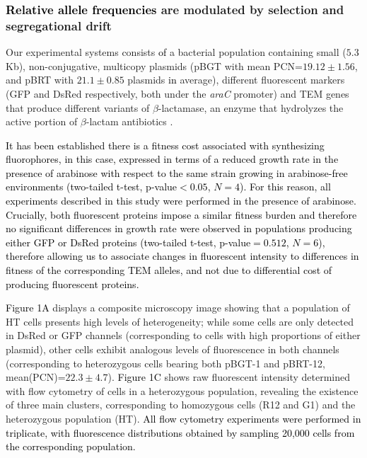 \documentclass[fleqn,12pt]{wlscirep}
\newcommand{\blue}[1]{\textcolor{black}{#1}}
\newcommand{\fig}[1]{\textcolor{black}{#1}}
\begin{document}
\subsubsection{\blue{Relative allele frequencies} are modulated by selection and segregational drift}
Our experimental systems consists \blue{of} a bacterial population containing small ($5.3$Kb), non-conjugative, multicopy plasmids (pBGT with mean PCN=$19.12\pm1.56$, and pBRT with $21.1\pm0.85$ plasmids \blue{in} average\cite{san2016multicopy}), different fluorescent markers (GFP and DsRed respectively, both under the {\em araC} promoter) and TEM genes that produce different variants of $\beta$-lactamase, an enzyme that hydrolyzes the active portion of $\beta$-lactam antibiotics \cite{Knox1995}. 

\blue{It has been established there is a fitness cost associated with synthesizing fluorophores, in this case, expressed in terms of a reduced growth rate in the presence of arabinose with respect to the same strain growing in arabinose-free environments (two-tailed t-test, p-value$<0.05$, $N=4$). For this reason, all experiments described in this study were performed in the presence of arabinose. Crucially, both fluorescent proteins impose a similar fitness burden and therefore no significant differences in growth rate were observed in populations producing either GFP or DsRed proteins (two-tailed t-test, p-value$=0.512$, $N=6$)\cite{SanMillan2014}, therefore allowing us to associate changes in fluorescent intensity to differences in fitness of the corresponding TEM alleles, and not due to differential cost of producing fluorescent proteins.}

\fig{Figure 1A} displays a composite microscopy image showing that a population of HT cells presents high levels of heterogeneity; while some cells are only detected in DsRed or GFP channels (corresponding to cells with high proportions of either plasmid), other cells exhibit analogous levels of fluorescence in both channels (corresponding to heterozygous cells bearing both pBGT-1 and pBRT-12, mean(PCN)=$22.3 \pm 4.7$).  \fig{Figure 1C} shows raw fluorescent intensity determined with flow cytometry of cells in a heterozygous population, revealing the existence of three main clusters, corresponding to homozygous cells (R12 and G1) and the heterozygous population (HT).  \blue{All flow cytometry experiments were performed in triplicate, with fluorescence distributions obtained by sampling 20,000 cells from the corresponding population.}
\end{document}
